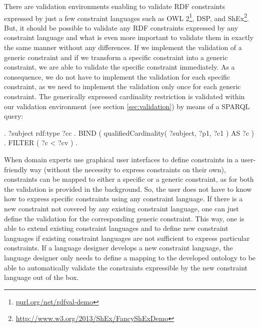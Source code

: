 \documentclass{llncs}
\begin{document}
There are validation environments enabling to validate RDF constraints expressed by just a few constraint languages such as OWL 2\footnote{\url{purl.org/net/rdfval-demo}\label{footnote1}}, DSP, and ShEx\footnote{\url{http://www.w3.org/2013/ShEx/FancyShExDemo}}.
But, it should be possible to validate any RDF constraints expressed by any constraint language and 
what is even more important to validate them in exactly the same manner without any differences. 
If we implement the validation of a generic constraint and if we transform a specific constraint into a generic constraint, we are able to validate the specific constraint immediately. 
As a consequence, we do not have to implement the validation for each specific constraint, as we need to implement the validation only once for each generic constraint. 
The generically expressed cardinality restriction is validated within our validation environment (see section \ref{sec:validation}) by means of a SPARQL query:
\begin{ex}
[   a PropertyConstraint ;
    contextClass ?cc ;
    leftProperties ( ?p1 ) ;
    classes ( ?c1 ) ;
    constrainingElement ">=" ;
    constrainingValue ?cv ] .
?subject rdf:type ?cc .
BIND ( qualifiedCardinality( ?subject, ?p1, ?c1 ) AS ?c ) .
FILTER ( ?c < ?cv ) .		  
\end{ex}

When domain experts use graphical user interfaces to define constraints in a user-friendly way (without the necessity to express constraints on their own), 
constraints can be mapped to either a specific or a generic constraint, as for both the validation is provided in the background.    
So, the user does not have to know how to express specific constraints using any constraint language.
If there is a new constraint not covered by any existing constraint language, one can just define the validation for the corresponding generic constraint.
This way, one is able to extend existing constraint languages and to define new constraint languages if existing constraint languages are not sufficient to express particular constraints.
If a language designer develops a new constraint language, 
the language designer only needs to define a mapping to the developed ontology
to be able to automatically validate the constraints expressible by the new constraint language out of the box.
\end{document}
